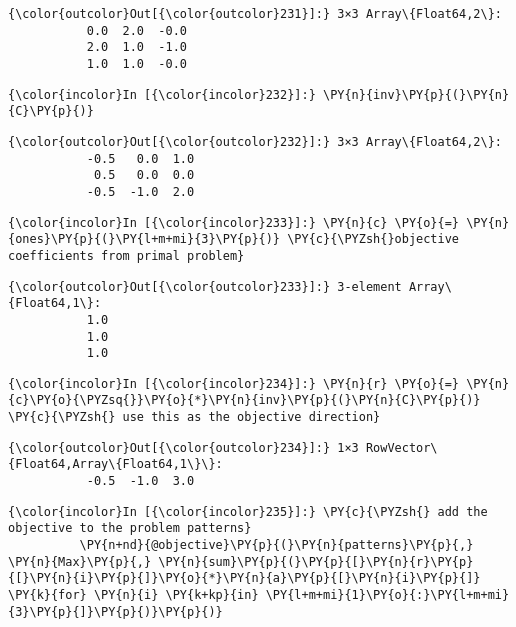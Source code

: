 \begin{Verbatim}[commandchars=\\\{\}]
{\color{outcolor}Out[{\color{outcolor}231}]:} 3×3 Array\{Float64,2\}:
           0.0  2.0  -0.0
           2.0  1.0  -1.0
           1.0  1.0  -0.0
\end{Verbatim}
            
    \begin{Verbatim}[commandchars=\\\{\}]
{\color{incolor}In [{\color{incolor}232}]:} \PY{n}{inv}\PY{p}{(}\PY{n}{C}\PY{p}{)}
\end{Verbatim}


\begin{Verbatim}[commandchars=\\\{\}]
{\color{outcolor}Out[{\color{outcolor}232}]:} 3×3 Array\{Float64,2\}:
           -0.5   0.0  1.0
            0.5   0.0  0.0
           -0.5  -1.0  2.0
\end{Verbatim}
            
    \begin{Verbatim}[commandchars=\\\{\}]
{\color{incolor}In [{\color{incolor}233}]:} \PY{n}{c} \PY{o}{=} \PY{n}{ones}\PY{p}{(}\PY{l+m+mi}{3}\PY{p}{)} \PY{c}{\PYZsh{}objective coefficients from primal problem}
\end{Verbatim}


\begin{Verbatim}[commandchars=\\\{\}]
{\color{outcolor}Out[{\color{outcolor}233}]:} 3-element Array\{Float64,1\}:
           1.0
           1.0
           1.0
\end{Verbatim}
            
    \begin{Verbatim}[commandchars=\\\{\}]
{\color{incolor}In [{\color{incolor}234}]:} \PY{n}{r} \PY{o}{=} \PY{n}{c}\PY{o}{\PYZsq{}}\PY{o}{*}\PY{n}{inv}\PY{p}{(}\PY{n}{C}\PY{p}{)}  \PY{c}{\PYZsh{} use this as the objective direction}
\end{Verbatim}


\begin{Verbatim}[commandchars=\\\{\}]
{\color{outcolor}Out[{\color{outcolor}234}]:} 1×3 RowVector\{Float64,Array\{Float64,1\}\}:
           -0.5  -1.0  3.0
\end{Verbatim}
            
    \begin{Verbatim}[commandchars=\\\{\}]
{\color{incolor}In [{\color{incolor}235}]:} \PY{c}{\PYZsh{} add the objective to the problem patterns}
          \PY{n+nd}{@objective}\PY{p}{(}\PY{n}{patterns}\PY{p}{,} \PY{n}{Max}\PY{p}{,} \PY{n}{sum}\PY{p}{(}\PY{p}{[}\PY{n}{r}\PY{p}{[}\PY{n}{i}\PY{p}{]}\PY{o}{*}\PY{n}{a}\PY{p}{[}\PY{n}{i}\PY{p}{]} \PY{k}{for} \PY{n}{i} \PY{k+kp}{in} \PY{l+m+mi}{1}\PY{o}{:}\PY{l+m+mi}{3}\PY{p}{]}\PY{p}{)}\PY{p}{)}
\end{Verbatim}

